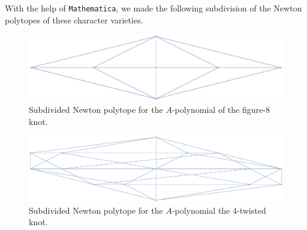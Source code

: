 \documentclass[11pt]{article}
\begin{document}
With the help of \texttt{Mathematica}, we made the following subdivision of
the Newton polytopes of these character varieties.
\begin{figure}[htpb]
  \centering
  \includegraphics[scale=0.5]{newtonsub_apoly_fig8}
  \caption{Subdivided Newton polytope for the $A$-polynomial of the
    figure-$8$ knot.}
  \end{figure}

\begin{figure}[htpb]
  \centering
  \includegraphics[scale=0.45]{newtonsub_apoly_twist4}
  \caption{Subdivided Newton polytope for the $A$-polynomial the
    $4$-twisted knot.}
\end{figure}
\end{document}
